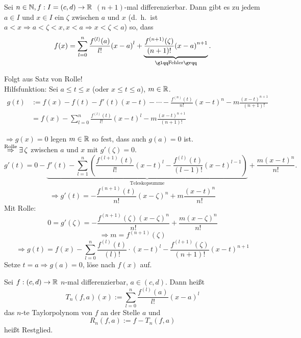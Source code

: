 \documentclass[../ana2.tex]{subfiles}
\begin{document}
\begin{lem}
    Sei \(n \in \mathbb{N}, f:I=(c,d)\rightarrow \mathbb{R}\) \((n+1)\)-mal 
    differenzierbar. Dann gibt es zu jedem 
    \( a \in I \) und \( x\in I \) ein 
    \( \zeta \) zwischen \(a\) und \(x\) 
    (d.\ h.\ ist \( a < x \Rightarrow a < \zeta < x, 
    x < a \Rightarrow x < \zeta < a \)) so, dass 
    \[ f(x) = \sum_{l=0}^n \frac{f^{(l)}(a)}{l!} {(x-a)}^l 
    + \underbrace{ \frac{f^{(n+1)}(\zeta)}{(n+1)!} {(x-a)}^{n+1} 
    }_{ \text{\gqq{Fehler}} }. \]
\end{lem}
\begin{bew}
    Folgt aus Satz von Rolle! \\
    Hilfsfunktion: Sei \( a \leq t \leq x \) 
    (oder \( x \leq t \leq a \)), \( m \in \mathbb{R} \). 
    \begin{align*}
        g(t) &:= f(x) - f(t) - f'(t)(x-t) - \cdots 
        - \frac{ f^{(n)}(t) }{ n! } {(x-t)}^n - m 
        \frac{ {(x-t)}^{n+1} }{ (n+1)! } \\
        &= f(x) - \sum_{l=0}^{n} 
        \frac{ f^{(l)}(t) }{ l! }{(x-t)}^l
        - m \frac{ {(x-t)}^{n+1} }{ (n+1)! }
    \end{align*}

    \( \Rightarrow g(x) = 0 \) legen \( m\in \mathbb{R} \) so fest, 
    dass auch \( g(a) = 0 \) ist. \\
    \( \oversett{Rolle}{\Rightarrow} \exists \zeta \) zwischen 
    \(a\) und \(x\) mit \( g'(\zeta) = 0 \). \\
    \[ g'(t) = 0 - \underbrace{ 
        f'(t) - \sum_{l=1}^n \left( 
        \frac{ f^{(l+1)}(t) }{ l! } {(x-t)}^l 
        - \frac{ f^{(l)}(t) }{ (l-1)! } {(x-t)}^{l-1}
    \right) }_{\text{Teleskopsumme}}
    + \frac{ m {(x-t)}^{n} }{ n! }. \]
    \[ \Rightarrow g'(t) = -\frac{ f^{(n+1)}(t) }{ n! } {(x - \zeta)}^n
    + m \frac{ {(x-t)}^n }{ n! } \]
    Mit Rolle:
    \[ 0 = g'(\zeta) = -\frac{ f^{(n+1)}(\zeta){(x-\zeta)}^n }{ n! } 
    + \frac{ m{(x-\zeta)}^n }{ n! } \]
    \[ \Rightarrow m = f^{(n+1)}(\zeta) \]
    \[ \Rightarrow g(t) = f(x) - \sum_{l=0}^{n} \frac{ f^{(l)}(t) }{ (l)! }
    \cdot {(x-t)}^l - \frac{ f^{(l+1)}(\zeta) }{ (n+1)! } {(x-t)}^{n+1} \]
    Setze \( t=a \Rightarrow g(a) = 0 \), löse nach \(f(x)\) auf.
\end{bew} 
\begin{defi}
    Sei \( f:(c,d)\rightarrow \mathbb{R} \) \(n\)-mal differenzierbar, 
    \( a \in (c,d) \). Dann heißt 
    \[ T_n(f,a)(x) := \sum_{l=0}^n 
    \frac{f^{(l)}(a)}{l!} {(x-a)}^l \]
    das \(n\)-te Taylorpolynom von \(f\) an der Stelle \(a\) 
    und \[ R_n(f,a) := f - T_n(f,a) \] heißt Restglied.
\end{defi}
\end{document}
